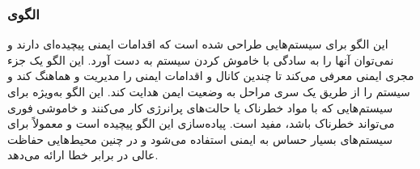 \subsubsection{الگوی }
\label{archSafeSafetyExecSec}
\begin{RTL}
این الگو \cite{ref4}
برای سیستم‌هایی طراحی شده است که اقدامات ایمنی پیچیده‌ای دارند
و نمی‌توان آنها را به سادگی با خاموش کردن سیستم به دست آورد.
این الگو یک جزء مجری ایمنی معرفی می‌کند تا چندین کانال
و اقدامات ایمنی را مدیریت و هماهنگ کند و سیستم را از طریق
یک سری مراحل به وضعیت ایمن هدایت کند. این الگو به‌ویژه برای سیستم‌هایی
که با مواد خطرناک یا حالت‌های پرانرژی کار می‌کنند و خاموشی فوری می‌تواند
خطرناک باشد، مفید است. پیاده‌سازی این الگو پیچیده است و معمولاً
برای سیستم‌های بسیار حساس به ایمنی استفاده می‌شود و در
چنین محیط‌هایی حفاظت عالی در برابر خطا ارائه می‌دهد.
\end{RTL}
